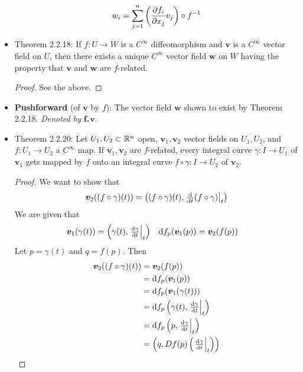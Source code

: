 \documentclass[../notes.tex]{subfiles}
\begin{document}
\begin{itemize}
    \begin{equation*}
        w_i = \sum_{j=1}^n\left( \pdv{f_i}{x_j}v_j \right)\circ f^{-1}
    \end{equation*}
    \item Theorem 2.2.18: If $f:U\to W$ is a $C^\infty$ diffeomorphism and $\bm{v}$ is a $C^\infty$ vector field on $U$, then there exists a unique $C^\infty$ vector field $\bm{w}$ on $W$ having the property that $\bm{v}$ and $\bm{w}$ are $f$-related.
    \begin{proof}
        See the above.
    \end{proof}
    \item \textbf{Pushforward} (of $\bm{v}$ by $f$): The vector field $\bm{w}$ shown to exist by Theorem 2.2.18. \emph{Denoted by} $\bm{f_*\pmb{v}}$.
    \item Theorem 2.2.20: Let $U_1,U_2\subset\mathbb{R}^n$ open, $\bm{v}_1,\bm{v}_2$ vector fields on $U_1,U_2$, and $f:U_1\to U_2$ a $C^\infty$ map. If $\bm{v}_1,\bm{v}_2$ are $f$-related, every integral curve $\gamma:I\to U_1$ of $\bm{v}_1$ gets mapped by $f$ onto an integral curve $f\circ\gamma:I\to U_2$ of $\bm{v}_2$.
    \begin{proof}
        We want to show that
        \begin{equation*}
            \bm{v}_2((f\circ\gamma)(t)) = \left( (f\circ\gamma)(t),\eval{\textstyle\dv{t}(f\circ\gamma)}_t \right)
        \end{equation*}
        We are given that
        \begin{align*}
            \bm{v}_1(\gamma(t)) &= \left( \gamma(t),\eval{\textstyle\dv{\gamma}{t}}_t \right)&
            \dd f_p(\bm{v}_1(p)) &= \bm{v}_2(f(p))
        \end{align*}
        Let $p=\gamma(t)$ and $q=f(p)$. Then
        \begin{align*}
            \bm{v}_2((f\circ\gamma)(t)) &= \bm{v}_2(f(p))\\
            &= \dd f_p(\bm{v}_1(p))\\
            &= \dd f_p(\bm{v}_1(\gamma(t)))\\
            &= \dd f_p\left( \gamma(t),\eval{\textstyle\dv{\gamma}{t}}_t \right)\\
            &= \dd f_p\left( p,\eval{\textstyle\dv{\gamma}{t}}_t \right)\\
            &= \left( q,Df(p)\left( \eval{\textstyle\dv{\gamma}{t}}_t \right) \right)\\

\end{align*}
\end{proof}
\end{itemize}
\end{document}
